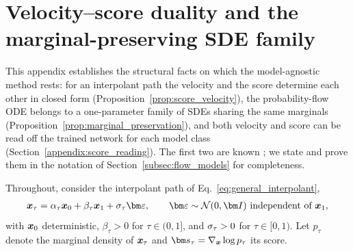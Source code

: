 \section{Velocity--score duality and the marginal-preserving SDE family}
\label{appendix:score_velocity}

This appendix establishes the structural facts on which the model-agnostic method rests: for an interpolant path the velocity and the score determine each other in closed form (Proposition~\ref{prop:score_velocity}), the probability-flow ODE belongs to a one-parameter family of SDEs sharing the same marginals (Proposition~\ref{prop:marginal_preservation}), and both velocity and score can be read off the trained network for each model class (Section~\ref{appendix:score_reading}). The first two are known \cite{albergo_stochastic_2023, song_score-based_2021, ma_sit_2024}; we state and prove them in the notation of Section~\ref{subsec:flow_models} for completeness.

Throughout, consider the interpolant path of Eq.~\eqref{eq:general_interpolant},
\begin{align}\label{eq:app_path}
    \bx_\tau = \alpha_\tau\bx_0 + \beta_\tau\bx_1 + \sigpath_\tau\latentnoise,
    \qquad \latentnoise\sim\mathcal{N}(0,\bI)\ \text{independent of}\ \bx_1,
\end{align}
with $\boldsymbol{x}_0$ deterministic, $\beta_\tau>0$ for $\tau\in(0,1]$, and $\sigma_\tau>0$ for $\tau\in[0,1)$. Let $p_\tau$ denote the marginal density of $\boldsymbol{x}_\tau$ and $\genscore_\tau=\nabla_{\bx}\log p_\tau$ its score.

